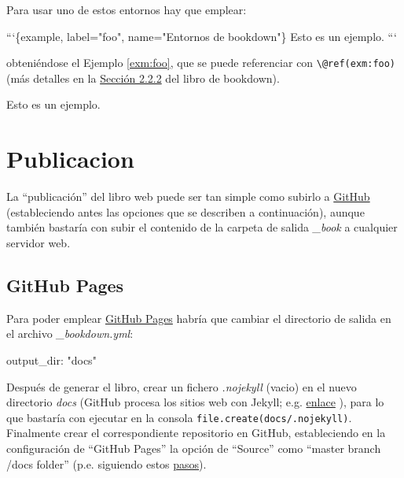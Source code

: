 \documentclass[]{book}
\newenvironment{Shaded}{\begin{snugshade}}{\end{snugshade}}
\newcommand{\StringTok}[1]{\textcolor[rgb]{0.31,0.60,0.02}{#1}}
\newcommand{\FunctionTok}[1]{\textcolor[rgb]{0.00,0.00,0.00}{#1}}
\newcommand{\AttributeTok}[1]{\textcolor[rgb]{0.77,0.63,0.00}{#1}}
\newcommand{\NormalTok}[1]{#1}
\theoremstyle{definition}
\theoremstyle{definition}
\theoremstyle{definition}
\theoremstyle{remark}
\let\BeginKnitrBlock\begin \let\EndKnitrBlock\end
\begin{document}
Para usar uno de estos entornos hay que emplear:

\begin{Shaded}
\begin{Highlighting}[]
\NormalTok{```\{example, label="foo", name="Entornos de bookdown"\}}
\NormalTok{Esto es un ejemplo.}
\NormalTok{```}
\end{Highlighting}
\end{Shaded}

obteniéndose el Ejemplo \ref{exm:foo}, que se puede referenciar con
\texttt{\textbackslash{}@ref(exm:foo)} (más detalles en la
\href{https://bookdown.org/yihui/bookdown/markdown-extensions-by-bookdown.html\#theorems}{Sección
2.2.2} del libro de bookdown).

\BeginKnitrBlock{example}[Entornos de bookdown]
\protect\hypertarget{exm:foo}{}{\label{exm:foo} {} }Esto es un ejemplo.
\EndKnitrBlock{example}

\chapter{Publicacion}\label{publicacion}

La ``publicación'' del libro web puede ser tan simple como subirlo a
\href{https://help.github.com}{GitHub} (estableciendo antes las opciones
que se describen a continuación), aunque también bastaría con subir el
contenido de la carpeta de salida \emph{\_book} a cualquier servidor
web.

\section{GitHub Pages}\label{github}

Para poder emplear \href{https://pages.github.com}{GitHub Pages} habría
que cambiar el directorio de salida en el archivo \emph{\_bookdown.yml}:

\begin{Shaded}
\begin{Highlighting}[]
\FunctionTok{output_dir:}\AttributeTok{ }\StringTok{"docs"}
\end{Highlighting}
\end{Shaded}

Después de generar el libro, crear un fichero \emph{.nojekyll} (vacio)
en el nuevo directorio \emph{docs} (GitHub procesa los sitios web con
Jekyll; e.g.
\href{https://help.github.com/articles/using-jekyll-as-a-static-site-generator-with-github-pages}{enlace}
), para lo que bastaría con ejecutar en la consola
\texttt{file.create(\textquotesingle{}docs/.nojekyll\textquotesingle{})}.
Finalmente crear el correspondiente repositorio en GitHub, estableciendo
en la configuración de ``GitHub Pages'' la opción de ``Source'' como
``master branch /docs folder'' (p.e. siguiendo estos
\href{https://help.github.com/articles/configuring-a-publishing-source-for-github-pages}{pasos}).
\end{document}
